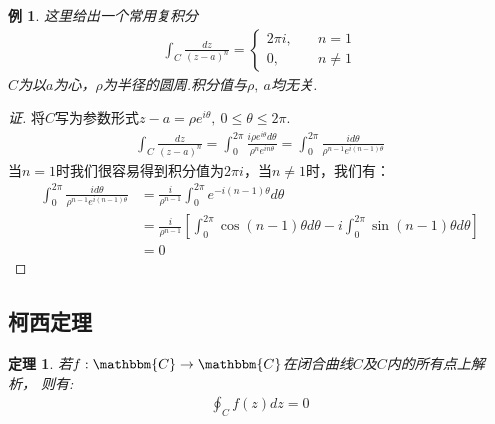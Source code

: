 \documentclass[12pt, a4paper]{ctexbook}
\newtheorem{theorem}{定理}[chapter] %
\newtheorem{example}{例}[chapter] %
\begin{document}
                \begin{example}
                    \label{ex:important_integral}
                    这里给出一个常用复积分
                    \begin{align*}
                        \int_{C}\frac{dz}{(z - a)^n} = 
                        \left\{
                            \begin{aligned}
                                2\pi i ,& \quad n = 1 \\
                                0 ,& \quad n \neq 1
                            \end{aligned}
                        \right.
                    \end{align*}
                    $C$为以$a$为心，$\rho$为半径的圆周.积分值与$\rho,\ a$均无关.
                \end{example}
                \begin{proof}[证]
                    \label{proof:important_integral}
                    将$C$写为参数形式$z - a = \rho e^{i\theta},\ 0 \leq \theta \leq 2\pi$.
                    \begin{align*}
                        \int_{C}\frac{dz}{(z - a)^n} = \int_{0}^{2\pi}\frac{i \rho e^{i\theta}d\theta}{\rho^n e^{in\theta}} = \int_{0}^{2\pi}\frac{id\theta}{\rho^{n - 1}e^{i(n-1)\theta}}
                    \end{align*}
                    当$n = 1$时我们很容易得到积分值为$2\pi i$，当$n \neq 1$时，我们有：
                    \begin{align*}
                        \int_{0}^{2\pi}\frac{id\theta}{\rho^{n - 1}e^{i(n-1)\theta}}
                        &= \frac{i}{\rho^{n - 1}}\int_{0}^{2\pi}e^{-i(n-1)\theta}d\theta\\
                        &= \frac{i}{\rho^{n - 1}}\left[ \int_{0}^{2\pi}\cos{(n - 1)\theta}d\theta - i \int_{0}^{2\pi}\sin{(n - 1)\theta}d\theta \right]\\
                        &= 0
                    \end{align*}
                \end{proof}

            \subsection{柯西定理}
                \begin{theorem}
                    \label{the:cauchy_theorem}
                    若$f:\mathbbm{C}\to\mathbbm{C}$在闭合曲线$C$及$C$内的所有点上解析，
                    则有:
                    \begin{align*}
                        \oint_{C}f(z)dz = 0
                    \end{align*}
                \end{theorem}
\end{document}
